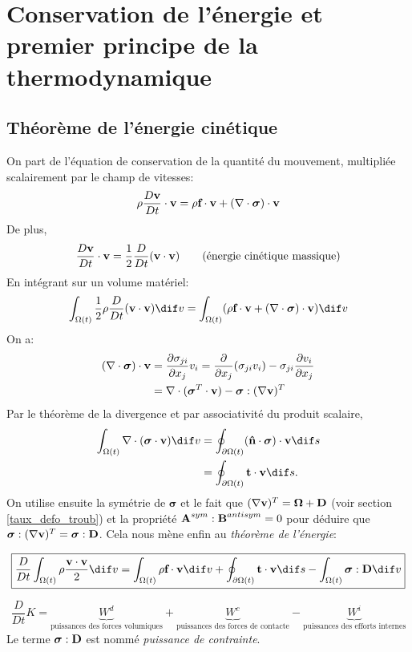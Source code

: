 \section{Conservation de l'énergie et premier principe de la thermodynamique}
\subsection{Théorème de l'énergie cinétique}
On part de l'équation de conservation de la quantité du mouvement, multipliée scalairement par le champ de vitesses:
$$\rho\frac{D\textbf{v}}{Dt}\cdot\textbf{v}=\rho\textbf{f}\cdot\textbf{v}+(\nabla\cdot\boldsymbol{\sigma})\cdot\textbf{v}$$
De plus, $$\frac{D\textbf{v}}{Dt}\cdot\textbf{v}=\frac{1}{2}\frac{D}{Dt}(\textbf{v}\cdot\textbf{v})\qquad\text{(énergie cinétique massique)}$$
En intégrant sur un volume matériel:
$$\int_{\Omega (t)}\frac{1}{2}\rho\frac{D}{Dt}(\fv{v}\cdot\fv{v}) \dif v=\int_{\Omega (t)}(\rho\fv{f}\cdot\fv{v}+(\nabla\cdot\boldsymbol{\sigma})\cdot\fv{v}) \dif v$$
On a:
\begin{align*}
(\nabla\cdot\boldsymbol{\sigma})\cdot\textbf{v}&=\frac{\partial \sigma_{ji}}{\partial x_j}v_i=\frac{\partial}{\partial x_j}(\sigma_{ji}v_i)-\sigma_{ji}\frac{\partial v_i}{\partial x_j}\\
 &=\nabla\cdot(\boldsymbol{\sigma}^T\cdot\textbf{v})-\boldsymbol{\sigma}:(\nabla\textbf{v})^T\\
\end{align*}
Par le théorème de la divergence et par associativité du produit scalaire,
\begin{align*}
  \int_{\Omega (t)}\nabla\cdot(\boldsymbol{\sigma}\cdot\fv{v}) \dif v
  & = \oint_{\partial \Omega (t)}(\sp{\fv{\^n}}{\boldsymbol{\sigma}}) \cdot \fv{v} \dif s\\
  & = \oint_{\partial \Omega (t)}\fv{t}\cdot\fv{v} \dif s.
\end{align*}
On utilise ensuite la symétrie de $\boldsymbol{\sigma}$ et le fait que $(\nabla\textbf{v})^T=\boldsymbol{\Omega}+\textbf{D}$ (voir section \ref{taux_defo_troub}) et la propriété $\textbf{A}^{sym}:\textbf{B}^{antisym}=0$ pour déduire que $\boldsymbol{\sigma}:(\nabla\textbf{v})^T=\boldsymbol{\sigma}:\textbf{D}$. Cela nous mène enfin au \emph{théorème de l'énergie}:

$$\boxed{\frac{D}{Dt}\int_{\Omega (t)}\rho\frac{\fv{v}\cdot\fv{v}}{2} \dif v=\int_{\Omega (t)}\rho\fv{f}\cdot\fv{v} \dif v+\oint_{\partial \Omega (t)}\fv{t}\cdot\fv{v} \dif s-\int_{\Omega (t)}\boldsymbol{\sigma}:\fv{D} \dif v}$$

$$\frac{D}{Dt}K=\underbrace{W^d}_{\text{puissances des forces volumiques}}+\underbrace{W^c}_{\text{puissances des forces de contacte}}-\underbrace{W^i}_{\text{puissances des efforts internes}}$$
Le terme $\boldsymbol{\sigma}:\textbf{D}$ est nommé \emph{puissance de contrainte}.
